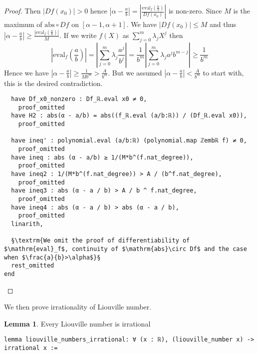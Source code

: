 \documentclass{report}
\theoremstyle{definition}
\newtheorem{lemma}{Lemma}[section]
\theoremstyle{plain}
\begin{document}
\begin{proof}
Then $|Df(x_0)|>0$ hence $\left|\alpha-\frac ab\right|=\left|\frac{\mathrm{eval}_f(\frac a b)}{Df(x_0)}\right|$ is non-zero. Since $M$ is the maximum of $\mathrm{abs}\circ Df$ on $[\alpha-1,\alpha+1]$. We have $|Df(x_0)|\le M$ and thus $\left|\alpha-\frac ab\right|\ge \frac{|\mathrm{eval}_f(\frac a b)|}{M}$. If we write $f(X)$ as $\sum_{j=0}^m \lambda_j X^j$ then
\begin{equation*}
\left|\mathrm{eval}_f\left(\frac a b\right)\right|=\left|\sum_{j=0}^m\lambda_j \frac{a^j}{b^j}\right|= \frac1{b^m}\left|\sum_{j=0}^m\lambda_j a^jb^{m-j}\right|\ge\frac1{b^m}
\end{equation*}
Hence we have $\left|\alpha-\frac a b\right|\ge \frac1{Mb^m}>\frac{A}{b^m}$. But we assumed $\left|\alpha-\frac ab\right|<\frac A{b^m}$ to start with, this is the desired contradiction.

\begin{verbatim}
  have Df_x0_nonzero : Df_ℝ.eval x0 ≠ 0,
    proof_omitted
  have H2 : abs(α - a/b) = abs((f_ℝ.eval (a/b:ℝ)) / (Df_ℝ.eval x0)),
    proof_omitted

  have ineq' : polynomial.eval (a/b:ℝ) (polynomial.map ℤembℝ f) ≠ 0,
    proof_omitted
  have ineq : abs (α - a/b) ≥ 1/(M*b^(f.nat_degree)),
    proof_omitted
  have ineq2 : 1/(M*b^(f.nat_degree)) > A / (b^f.nat_degree),
    proof_omitted
  have ineq3 : abs (α - a / b) > A / b ^ f.nat_degree,
    proof_omitted
  have ineq4 : abs (α - a / b) > abs (α - a / b),
    proof_omitted 
  linarith,
  
  §\textrm{We omit the proof of differentiability of $\mathrm{eval}_f$, continuity of $\mathrm{abs}\circ Df$ and the case when $\frac{a}{b}>\alpha$}§
  rest_omitted
end
\end{verbatim}
\end{proof}

We then prove irrationality of Liouville number. 
\begin{lemma}
Every Liouville number is irrational
\begin{verbatim} 
lemma liouville_numbers_irrational: ∀ (x : ℝ), (liouville_number x) -> irrational x :=
\end{verbatim}
\end{lemma}
\end{document}
